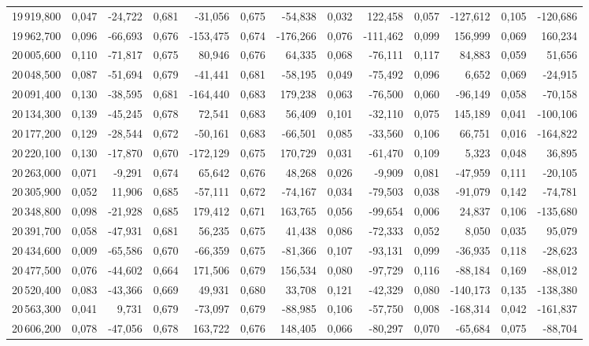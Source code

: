 \begin{longtable}{rrrrrrrrrrrrr}
19\,919,800 & 0,047 & -24,722 & 0,681 & -31,056 & 0,675 & -54,838 & 0,032 & 122,458 & 0,057 & -127,612 & 0,105 & -120,686\\
19\,962,700 & 0,096 & -66,693 & 0,676 & -153,475 & 0,674 & -176,266 & 0,076 & -111,462 & 0,099 & 156,999 & 0,069 & 160,234\\
20\,005,600 & 0,110 & -71,817 & 0,675 & 80,946 & 0,676 & 64,335 & 0,068 & -76,111 & 0,117 & 84,883 & 0,059 & 51,656\\
20\,048,500 & 0,087 & -51,694 & 0,679 & -41,441 & 0,681 & -58,195 & 0,049 & -75,492 & 0,096 & 6,652 & 0,069 & -24,915\\
20\,091,400 & 0,130 & -38,595 & 0,681 & -164,440 & 0,683 & 179,238 & 0,063 & -76,500 & 0,060 & -96,149 & 0,058 & -70,158\\
20\,134,300 & 0,139 & -45,245 & 0,678 & 72,541 & 0,683 & 56,409 & 0,101 & -32,110 & 0,075 & 145,189 & 0,041 & -100,106\\
20\,177,200 & 0,129 & -28,544 & 0,672 & -50,161 & 0,683 & -66,501 & 0,085 & -33,560 & 0,106 & 66,751 & 0,016 & -164,822\\
20\,220,100 & 0,130 & -17,870 & 0,670 & -172,129 & 0,675 & 170,729 & 0,031 & -61,470 & 0,109 & 5,323 & 0,048 & 36,895\\
20\,263,000 & 0,071 & -9,291 & 0,674 & 65,642 & 0,676 & 48,268 & 0,026 & -9,909 & 0,081 & -47,959 & 0,111 & -20,105\\
20\,305,900 & 0,052 & 11,906 & 0,685 & -57,111 & 0,672 & -74,167 & 0,034 & -79,503 & 0,038 & -91,079 & 0,142 & -74,781\\
20\,348,800 & 0,098 & -21,928 & 0,685 & 179,412 & 0,671 & 163,765 & 0,056 & -99,654 & 0,006 & 24,837 & 0,106 & -135,680\\
20\,391,700 & 0,058 & -47,931 & 0,681 & 56,235 & 0,675 & 41,438 & 0,086 & -72,333 & 0,052 & 8,050 & 0,035 & 95,079\\
20\,434,600 & 0,009 & -65,586 & 0,670 & -66,359 & 0,675 & -81,366 & 0,107 & -93,131 & 0,099 & -36,935 & 0,118 & -28,623\\
20\,477,500 & 0,076 & -44,602 & 0,664 & 171,506 & 0,679 & 156,534 & 0,080 & -97,729 & 0,116 & -88,184 & 0,169 & -88,012\\
20\,520,400 & 0,083 & -43,366 & 0,669 & 49,931 & 0,680 & 33,708 & 0,121 & -42,329 & 0,080 & -140,173 & 0,135 & -138,380\\
20\,563,300 & 0,041 & 9,731 & 0,679 & -73,097 & 0,679 & -88,985 & 0,106 & -57,750 & 0,008 & -168,314 & 0,042 & -161,837\\
20\,606,200 & 0,078 & -47,056 & 0,678 & 163,722 & 0,676 & 148,405 & 0,066 & -80,297 & 0,070 & -65,684 & 0,075 & -88,704\\

\end{longtable}

